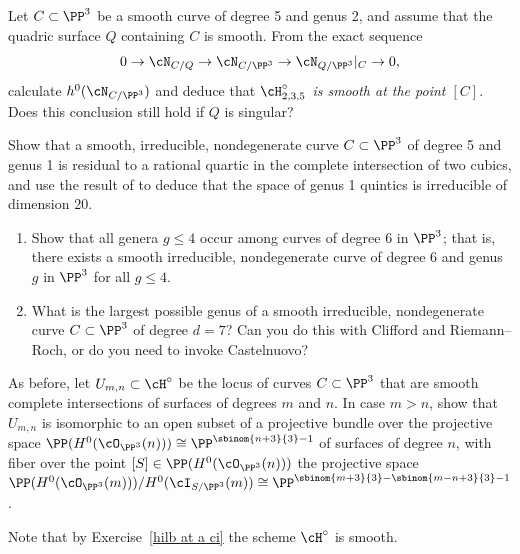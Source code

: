 \begin{exercise}
Let $C \subset \PP^3$ be a smooth curve of degree 5 and genus 2, and
assume that the quadric surface $Q$ containing $C$ is smooth. From the
exact sequence
$$
0 \to \cN_{C/Q} \to  \cN_{C/\PP^3} \to  \cN_{Q/\PP^3}|_C \to 0,
$$
calculate $h^0(\cN_{C/\PP^3})$ and deduce that \emph{$\cH^\circ_{2,3,5}$
is smooth at the point $[C]$}. Does  this conclusion still hold if $Q$
is singular?
\end{exercise}

\begin{exercise}\label{quintics genus 1}
Show that a smooth, irreducible, nondegenerate curve $C \subset \PP^3$
of degree 5 and genus 1 is residual to a rational quartic in the complete
intersection of two cubics, and use the result of
to deduce that the space of genus 1 quintics is irreducible
of dimension 20.
\end{exercise}

\begin{exercise}
\begin{enumerate}
\item Show that all genera $g \leq 4$  occur among curves of degree 6
in $\PP^3$; that is, there exists a smooth irreducible, nondegenerate
curve of degree 6 and genus $g$ in $\PP^3$ for all $g \leq 4$.
\item What is the largest possible genus of a smooth irreducible,
nondegenerate curve $C \subset \PP^3$ of degree $d=7$? Can you do this
with Clifford and Riemann--Roch, or do you need to invoke Castelnuovo?
\end{enumerate}
\end{exercise}

\begin{exercise}\label{second complete intersection exercise}
As before, let $U_{m,n} \subset \cH^\circ$ be the locus of curves $C
\subset \PP^3$ that are smooth complete intersections of surfaces of
degrees $m$ and $n$.
 In case $m > n$, show that $U_{m,n}$ is isomorphic to an open subset of
 a projective bundle over the projective space $\PP(H^0(\cO_{\PP^3}(n)))
 \cong \PP^{\sbinom{n+3}{3}-1}$ of surfaces of degree $n$, with fiber
 over the point $[S] \in \PP(H^0(\cO_{\PP^3}(n)))$ the projective space
 $\PP(H^0(\cO_{\PP^3}(m)))/H^0(\cI_{S/\PP^3}(m)) \cong \PP^{\sbinom{m+3}{3}
 - \sbinom{m-n+3}{3} - 1}$.

 Note that  by Exercise~\ref{hilb at a ci}  the scheme $\cH^\circ$
 is smooth.
\end{exercise}


